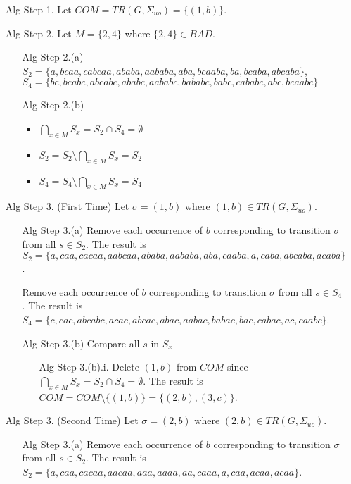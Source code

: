 \documentclass{article}
\begin{document}
			\begin{enumerate}
			    \item[Alg Step 1.] Let $COM = TR(G, \Sigma_{uo}) = \{(1, b)\}$.
			    \item[Alg Step 2.] Let $M = \{2, 4\}$ where $\{2, 4\} \in BAD$.
			    \begin{enumerate}
			        \item[Alg Step 2.(a)] $S_2 = \{a, bcaa, cabcaa, ababa, aababa, aba, bcaaba, ba, bcaba, abcaba\}$,\\$S_4 = \{bc, bcabc, abcabc, ababc, aababc, bababc, babc, cababc, abc, bcaabc\}$
			        \item[Alg Step 2.(b)]
			            \begin{itemize}
			                \item
			                    $\bigcap_{x \in M} S_x = S_2 \cap S_4 = \emptyset$
			                \item $S_2 = S_2 \setminus \bigcap_{x \in M} S_x = S_2$
			                \item $S_4 = S_4 \setminus \bigcap_{x \in M} S_x = S_4$
			            \end{itemize}
			    \end{enumerate}
			    \item[Alg Step 3. (First Time)] Let $\sigma = (1, b)$ where $(1, b) \in TR(G, \Sigma_{uo})$.
			    \begin{enumerate}
			        \item[Alg Step 3.(a)]
			            Remove each occurrence of $b$ corresponding to transition $\sigma$ from all $s \in S_2$.
			            The result is $S_2 = \{a, caa, cacaa, aabcaa, ababa, aababa, aba, caaba, a, caba, abcaba, acaba\}$.

			            Remove each occurrence of $b$ corresponding to transition $\sigma$ from all $s \in S_4$.
			            The result is $S_4 = \{c, cac, abcabc, acac, abcac, abac, aabac, babac, bac, cabac, ac, caabc\}$.
			        \item[Alg Step 3.(b)]
			            Compare all $s$ in $S_x$
			        \begin{enumerate}
			            \item[Alg Step 3.(b).i.]
			                Delete $(1, b)$ from $COM$ since $\bigcap_{x \in M} S_x = S_2 \cap S_4 = \emptyset$.
			                The result is $COM = COM \setminus \{(1, b)\} = \{(2,b), (3,c)\}$.
			        \end{enumerate}
			    \end{enumerate}
			    \item[Alg Step 3. (Second Time)] Let $\sigma = (2, b)$ where $(2, b) \in TR(G, \Sigma_{uo})$.
			    \begin{enumerate}
			        \item[Alg Step 3.(a)]
			            Remove each occurrence of $b$ corresponding to transition $\sigma$ from all $s \in S_2$.
			            The result is $S_2 = \{a, caa, cacaa, aacaa, aaa, aaaa, aa, caaa, a, caa, acaa, acaa\}$.


\end{enumerate}
\end{enumerate}
\end{document}
